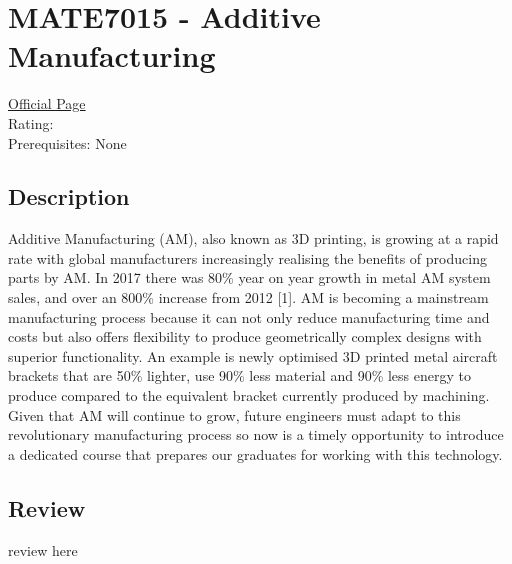 \hypertarget{MATE7015}{\section{MATE7015 - Additive Manufacturing}}

\large
\textcolor{turbo_purple}{\href{https://my.uq.edu.au/programs-courses/course.html?course_code=MATE7015}{Official Page}} \\
Rating: \cstar\cstar\cstar\cstar\ostar \\
Prerequisites: None

\normalsize
\subsection*{Description}
Additive Manufacturing (AM), also known as 3D printing, is growing at a rapid rate with global manufacturers increasingly realising the benefits of producing parts by AM.
In 2017 there was 80\% year on year growth in metal AM system sales, and over an 800\% increase from 2012 [1].
AM is becoming a mainstream manufacturing process because it can not only reduce manufacturing time and costs but also offers flexibility to produce geometrically complex designs with superior functionality.
An example is newly optimised 3D printed metal aircraft brackets that are 50\% lighter, use 90\% less material and 90\% less energy to produce compared to the equivalent bracket currently produced by machining.
Given that AM will continue to grow, future engineers must adapt to this revolutionary manufacturing process so now is a timely opportunity to introduce a dedicated course that prepares our graduates for working with this technology.

\subsection*{Review}
review here
